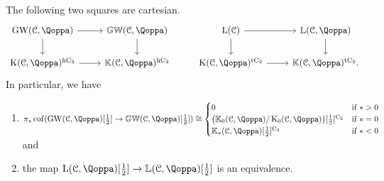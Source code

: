 \begin{theorem}
\label{theorem:Karoubi-pullback-squares}%
The following two squares are cartesian.
\[
\begin{tikzcd}
\GW(\C,\QF)\ar[r]\ar[d] & \KGW(\C,\QF)\ar[d] & \L(\C) \ar[r] \ar[d] & \KL(\C,\QF) \ar[d] \\
\K(\C,\QF)^\hC\ar[r] & \KK(\C,\QF)^\hC & \K(\C,\QF)^\tC \ar[r] & \KK(\C,\QF)^{\tC}.
\end{tikzcd}
\]
In particular, we have 
\begin{enumerate}
\item $\pi_*\cof(\GW(\C,\QF)[\frac{1}{2}] \to \KGW(\C,\QF)[\frac{1}{2}]) \cong 
\begin{cases}
0 & \text{if } *  >0 \\
\big(\KK_0(\C,\QF) / \K_0(\C,\QF)\big) [\frac{1}{2}]^{\Ct} & \text{if } * =0 \\
\KK_*(\C,\QF)[\frac{1}{2}]^{\Ct} & \text{if } *  <0
\end{cases} $
and
\item the map $\L(\C,\QF)[\frac{1}{2}] \to \KL(\C,\QF)[\frac{1}{2}]$ is an equivalence.
\end{enumerate}
\end{theorem}
